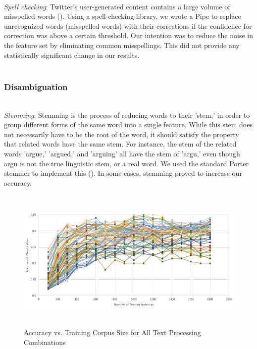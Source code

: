 \documentclass[letterpaper]{article}
\begin{document}
~\\
\textit{Spell checking}: Twitter's user-generated content contains a large volume of misspelled words (\citeauthor{Laboreiro:2010:TMM:1871840.1871853}). Using a spell-checking library, we wrote a Pipe to replace unrecognized words (misspelled words) with their corrections if the confidence for correction was above a certain threshold. Our intention was to reduce the noise in the feature set by eliminating common misspellings. This did not provide any statistically significant change in our results. \\
~\\
\subsubsection{Disambiguation}
~\\
\textit{Stemming}: Stemming is the process of reducing words to their 'stem,' in order to group different forms of the same word into a single feature. While this stem does not necessarily have to be the root of the word, it should satisfy the property that related words have the same stem. For instance, the stem of the related words 'argue,' 'argued,' and 'arguing' all have the stem of 'argu,' even though argu is not the true linguistic stem, or a real word. We used the standard Porter stemmer to implement this (\citeauthor{Porter, M.}).
In some cases, stemming proved to increase our accuracy.
\\

\begin{figure}[t!]
\centering
\includegraphics[height=7cm]{chart}
\caption{Accuracy vs. Training Corpus Size for All Text Processing Combinations}
\label{fig:chart}
\end{figure}
\end{document}
